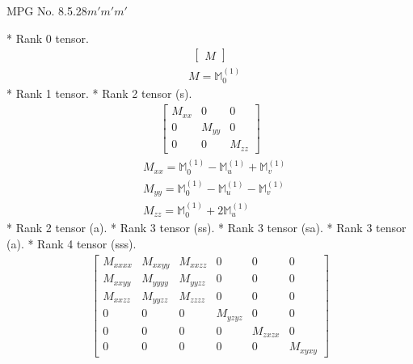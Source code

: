 \documentclass[fleqn,8pt,landscape]{jsarticle}
\begin{document}
\setcounter{MaxMatrixCols}{32}

\renewcommand{\tablename}{Table~}
\renewcommand{\figurename}{Figure~}
\begin{center}
\LARGE
MPG No. 8.5.28\quad$m'm'm'$
\end{center}
* Rank 0 tensor.
\begin{align*}
\begin{bmatrix} M \end{bmatrix}
\end{align*}
\begin{align*}
& M = \mathbb{M}_{0}^{(1)}
\end{align*}
* Rank 1 tensor.
* Rank 2 tensor (s).
\begin{align*}
\begin{bmatrix} M_{xx} & 0 & 0 \\ 0 & M_{yy} & 0 \\ 0 & 0 & M_{zz} \end{bmatrix}
\end{align*}
\begin{align*}
& M_{xx} = \mathbb{M}_{0}^{(1)} - \mathbb{M}_{u}^{(1)} + \mathbb{M}_{v}^{(1)} \\
& M_{yy} = \mathbb{M}_{0}^{(1)} - \mathbb{M}_{u}^{(1)} - \mathbb{M}_{v}^{(1)} \\
& M_{zz} = \mathbb{M}_{0}^{(1)} + 2 \mathbb{M}_{u}^{(1)}
\end{align*}
* Rank 2 tensor (a).
* Rank 3 tensor (ss).
* Rank 3 tensor (sa).
* Rank 3 tensor (a).
* Rank 4 tensor (sss).
\begin{align*}
\begin{bmatrix} M_{xxxx} & M_{xxyy} & M_{xxzz} & 0 & 0 & 0 \\ M_{xxyy} & M_{yyyy} & M_{yyzz} & 0 & 0 & 0 \\ M_{xxzz} & M_{yyzz} & M_{zzzz} & 0 & 0 & 0 \\ 0 & 0 & 0 & M_{yzyz} & 0 & 0 \\ 0 & 0 & 0 & 0 & M_{zxzx} & 0 \\ 0 & 0 & 0 & 0 & 0 & M_{xyxy} \end{bmatrix}
\end{align*}
\end{document}
